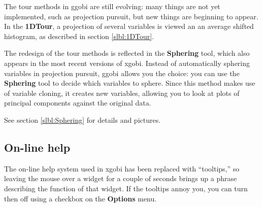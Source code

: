 \documentclass[11pt]{article}
\begin{document}
The tour methods in ggobi are still evolving:  many things are not
yet implemented, such as projection pursuit, but new things are
beginning to appear.  In the {\bf 1DTour}, a projection of several
variables is viewed an an average shifted histogram, as described
in section \ref{slbl:1DTour}.

The redesign of the tour methods is reflected in the {\bf Sphering}
tool, which also appears in the most recent versions of xgobi.
Instead of automatically sphering variables in projection pursuit,
ggobi allows you the choice:  you can use the {\bf Sphering} tool to
decide which variables to sphere.  Since this method makes use of
variable cloning, it creates new variables, allowing you to look at
plots of principal components against the original data.

See section \ref{slbl:Sphering} for details and pictures.

\subsection{On-line help}

The on-line help system used in xgobi has been replaced with
``tooltips,'' so leaving the mouse over a widget for a couple of
seconds brings up a phrase describing the function of that widget.
If the tooltips annoy you, you can turn then off using a
checkbox on the {\bf Options} menu.
\end{document}
